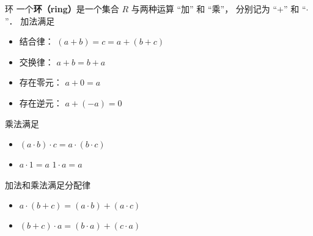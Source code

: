 
\begin{definition}{环}
一个\textbf{环（ring）}是一个集合 $R$ 与两种运算 “加” 和 “乘”， 分别记为 “$+$” 和 “$\cdot$”． 加法满足 
\begin{itemize}
\item 结合律： $(a + b) = c = a + (b + c)$
\item 交换律： $a + b = b + a$
\item 存在零元： $a + 0 = a$
\item 存在逆元： $a + (-a) = 0$
\end{itemize}
乘法满足
\begin{itemize}
\item $(a\cdot b)\cdot c = a \cdot (b \cdot c)$
\item $a \cdot 1 = a$ $1 \cdot a = a$
\end{itemize}
加法和乘法满足分配律
\begin{itemize}
\item $a \cdot (b + c) = (a \cdot b) + (a \cdot c)$
\item $(b + c) \cdot a = (b \cdot a) + (c \cdot a)$
\end{itemize}
\end{definition}
